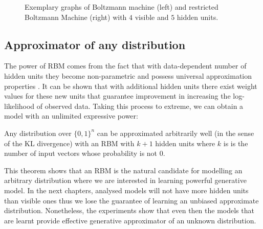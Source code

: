 \begin{figure}[!h]
\begin{center}
\end{center}
\endminipage\hfill
  \caption[Boltzmann Machines]{Exemplary graphs of Boltzmann machine (left) and restricted Boltzmann Machine (right) with $4$ visible and $5$ hidden units.}
  \label{fig:bm}
\end{figure}

\subsection{Approximator of any distribution}
The power of RBM comes from the fact that with data-dependent number of hidden units they become non-parametric and possess universal approximation properties \cite{le2008representational}.
It can be shown that with additional hidden units there exist weight values for these new units that guarantee improvement in increasing the log-likelihood of observed data. Taking this process to extreme, we can obtain a model with an unlimited expressive power:
\begin{theorem}  Any distribution over $\{0,1 \}^n$ can be approximated arbitrarily well (in the sense of the KL divergence) with an RBM with $k+1$ hidden units where	$k$ is is the number of input vectors whose probability is not $0$.
\end{theorem}
This theorem shows that an RBM is the natural candidate for modelling an arbitrary distribution where we are interested in learning powerful generative model. In the next chapters, analysed models will not have more hidden units than visible ones thus we lose the guarantee of learning an unbiased approximate distribution. Nonetheless, the experiments show that even then the models that are learnt provide effective generative approximator of an unknown distribution.

